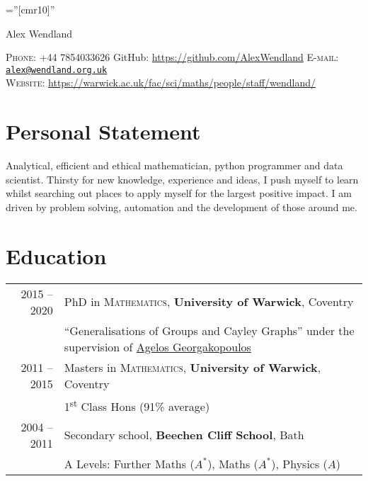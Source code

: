\documentclass[a4paper,10pt]{article}
\begin{document}
\pagestyle{empty} %

\font\fb=''[cmr10]'' %

\par{\centering
		{\Huge Alex Wendland
	}\bigskip\par}
\vspace{-0.3 cm}
\begin{center}
	\textsc{Phone:} +44 7854033626 \hspace{1cm} GitHub: \href{https://github.com/AlexWendland}{https://github.com/AlexWendland} \hspace{1cm} \textsc{E-mail:} \href{mailto:alex@wendland.org.uk}{\texttt{alex@wendland.org.uk}}\\
	\textsc{Website:} \href{https://warwick.ac.uk/fac/sci/maths/people/staff/wendland/}{https://warwick.ac.uk/fac/sci/maths/people/staff/wendland/}
\end{center}


\section{Personal Statement}
Analytical, efficient and ethical mathematician, python programmer and data scientist. Thirsty for new knowledge, experience and ideas, I push myself to learn whilst searching out places to apply myself for the largest positive impact. I am driven by problem solving, automation and the development of those around me.

\vspace{-0.05 in}

\section{Education}
\begin{tabular}{rl}	
	\textsc{} 2015 -- 2020 & PhD in \textsc{Mathematics}, \textbf{University of Warwick}, Coventry\\
	& ``Generalisations of Groups and Cayley Graphs'' under the supervision of \href{https://homepages.warwick.ac.uk/~maslar/}{Agelos Georgakopoulos}\\
	\textsc{} 2011 -- 2015& Masters in \textsc{Mathematics}, \textbf{University of Warwick}, Coventry\\
	& 1\textsuperscript{st} Class Hons (91\% average)\\
	\textsc{} 2004 -- 2011& Secondary school, \textbf{Beechen Cliff School}, Bath\\
	&  A Levels: Further Maths ($A^{\ast}$), Maths ($A^{\ast}$), Physics ($A$)
\end{tabular}
\end{document}
